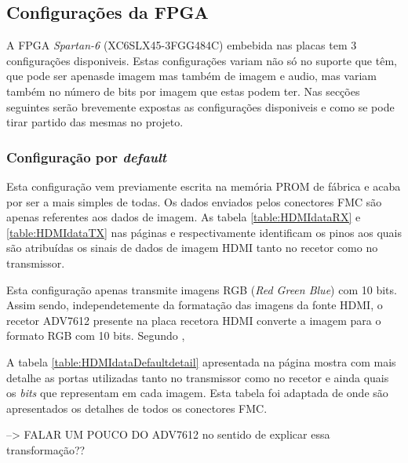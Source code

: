 \subsection{Configurações da FPGA} \label{subsec:HDMIconfig}

A FPGA \textit{Spartan-6} (XC6SLX45-3FGG484C) embebida nas placas tem 3 configurações disponiveis. Estas configurações variam não só no suporte que têm, que pode ser apenasde imagem mas também de imagem e audio, mas variam também no número de bits por imagem que estas podem ter. Nas secções seguintes serão brevemente expostas as configurações disponiveis e como se pode tirar partido das mesmas no projeto.


\subsubsection{Configuração por \textit{default}} \label{subsubsec:HDMIconfigdefault}

Esta configuração vem previamente escrita na memória PROM de fábrica e acaba por ser a mais simples de todas. Os dados enviados pelos conectores FMC são apenas referentes aos dados de imagem. As tabela \ref{table:HDMIdataRX} e \ref{table:HDMIdataTX} nas páginas \pageref{table:HDMIdataRX} e \pageref{table:HDMIdataTX} respectivamente identificam os pinos aos quais são atribuídas os sinais de dados de imagem HDMI tanto no recetor como no transmissor.

Esta configuração apenas transmite imagens RGB (\textit{Red Green Blue}) com 10 bits. Assim sendo, independetemente da formatação das imagens da fonte HDMI, o recetor ADV7612 presente na placa recetora HDMI converte a imagem para o formato RGB com 10 bits. Segundo \cite{R016}, 


A tabela \ref{table:HDMIdataDefaultdetail} apresentada na página \pageref{table:HDMIdataDefaultdetail} mostra com  mais detalhe as portas utilizadas tanto no transmissor como no recetor e ainda quais os \textit{bits} que representam em cada imagem. Esta tabela foi adaptada de \cite{R009} onde são apresentados os detalhes de todos os conectores FMC.

--> FALAR UM POUCO DO ADV7612 no sentido de explicar essa transformação??



